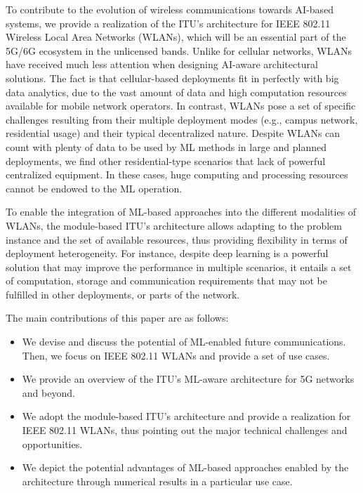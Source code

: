 \documentclass{article}
\begin{document}
To contribute to the evolution of wireless communications towards AI-based systems, we provide a realization of the ITU's architecture for IEEE 802.11 Wireless Local Area Networks (WLANs), which will be an essential part of the 5G/6G ecosystem in the unlicensed bands. Unlike for cellular networks, WLANs have received much less attention when designing AI-aware architectural solutions. The fact is that cellular-based deployments fit in perfectly with big data analytics, due to the vast amount of data and high computation resources available for mobile network operators. In contrast, WLANs pose a set of specific challenges resulting from their multiple deployment modes (e.g., campus network, residential usage) and their typical decentralized nature. Despite WLANs can count with plenty of data to be used by ML methods in large and planned deployments, we find other residential-type scenarios that lack of powerful centralized equipment. In these cases, huge computing and processing resources cannot be endowed to the ML operation. 

To enable the integration of ML-based approaches into the different modalities of WLANs, the module-based ITU's architecture allows adapting to the problem instance and the set of available resources, thus providing flexibility in terms of deployment heterogeneity. For instance, despite deep learning is a powerful solution that may improve the performance in multiple scenarios, it entails a set of computation, storage and communication requirements that may not be fulfilled in other deployments, or parts of the network.

The main contributions of this paper are as follows:
\begin{itemize}
\item We devise and discuss the potential of ML-enabled future communications. Then, we focus on IEEE 802.11 WLANs and provide a set of use cases. 
\item We provide an overview of the ITU's ML-aware architecture for 5G networks and beyond.
\item We adopt the module-based ITU's architecture and provide a realization for IEEE 802.11 WLANs, thus pointing out the major technical challenges and opportunities.
\item We depict the potential advantages of ML-based approaches enabled by the architecture through numerical results in a particular use case.	
\end{itemize}

\end{document}
